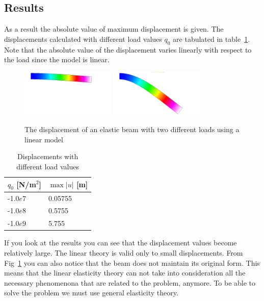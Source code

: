 \subsection*{Results}

As a result the absolute value of maximum displacement is given. The 
displacements calculated with different load values $q_0$ are tabulated in 
table~\ref{tb:struct3a}. Note that the absolute value of the
displacement varies linearly with respect to the load since the model
is linear.

\begin{figure}[h!]
\begin{center}
  \includegraphics[width=0.4\textwidth,angle=0]{beam1.png}
  \includegraphics[width=0.4\textwidth,angle=0]{beam2.png}
  \caption{The displacement of an elastic beam with two different loads
using a linear model}
  \label{fig:elast_beam1}
\end{center}
\end{figure}

\begin{table}[h]
\caption{Displacements with different load values}
\label{tb:struct3a}
\begin{center}
\begin{tabular}{ll} \hline
$q_0$ [N/m$^2$] & $\max |u|$ [m] \\ \hline
-1.0$e7$ & 0.05755 \\
-1.0$e8$ & 0.5755 \\
-1.0$e9$ & 5.755 \\ \hline
\end{tabular}
\end{center}
\end{table}

If you look at the results you can see that the displacement values
become relatively large. The linear theory is valid only to small 
displacements. From Fig~\ref{fig:elast_beam1} you can also notice that the
beam does not maintain its original form. This means that the linear 
elasticity theory can not take into consideration all the necessary 
phenomenona that are related to the problem, anymore. To be able to 
solve the problem we must use general elasticity theory.

